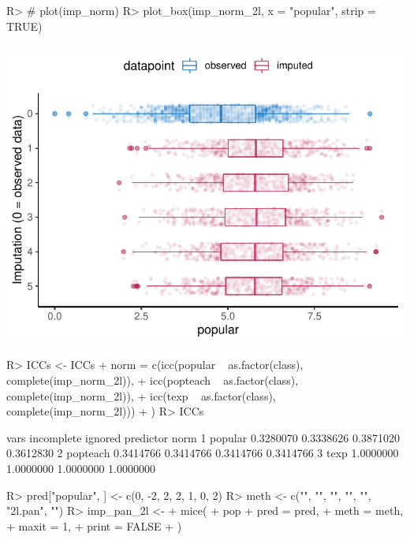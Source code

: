 \documentclass[
]{jss}
\begin{document}
\begin{CodeChunk}
\begin{CodeInput}
R> # plot(imp_norm)
R> plot_box(imp_norm_2l, x = "popular", strip = TRUE)
\end{CodeInput}


\begin{center}\includegraphics{Manuscript_files/figure-latex/pop_norm_eval-1} \end{center}

\begin{CodeInput}
R> ICCs <- ICCs %
+            norm = c(icc(popular ~ as.factor(class), complete(imp_norm_2l)), 
+                     icc(popteach ~ as.factor(class), complete(imp_norm_2l)), 
+                     icc(texp ~ as.factor(class), complete(imp_norm_2l)))
+            )
R> ICCs
\end{CodeInput}
\begin{CodeOutput}
      vars incomplete   ignored predictor      norm
1  popular  0.3280070 0.3338626 0.3871020 0.3612830
2 popteach  0.3414766 0.3414766 0.3414766 0.3414766
3     texp  1.0000000 1.0000000 1.0000000 1.0000000
\end{CodeOutput}
\end{CodeChunk}

\begin{CodeChunk}
\begin{CodeInput}
R> pred["popular", ] <- c(0, -2, 2, 2, 1, 0, 2)
R> meth <- c("", "", "", "", "", "2l.pan", "")
R> imp_pan_2l <-
+   mice(
+     pop %
+     pred = pred,
+     meth = meth,
+     maxit = 1,
+     print = FALSE
+   )
\end{CodeInput}
\end{CodeChunk}
\end{document}
